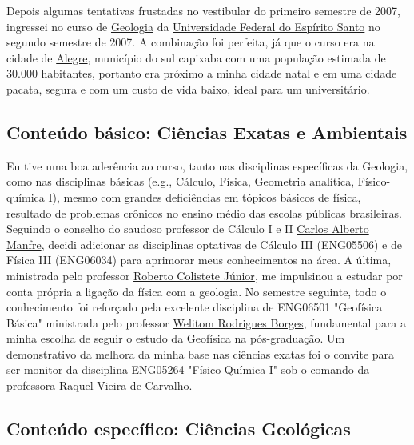 \documentclass[10pt,a4paper,oneside]{book}
\begin{document}
Depois algumas tentativas frustadas no vestibular do primeiro semestre de 2007, ingressei no curso de \href{https://geologia.ufes.br/}{Geologia} da \href{https://www.ufes.br/}{Universidade Federal do Espírito Santo} no segundo semestre de 2007. A combinação foi perfeita, já que o curso era na cidade de \href{https://alegre.es.gov.br/}{Alegre}, município do sul capixaba com uma população estimada de 30.000 habitantes, portanto era próximo a minha cidade natal e em uma cidade pacata, segura e com um custo de vida baixo, ideal para um universitário.

\subsection{Conteúdo básico: Ciências Exatas e Ambientais}
\label{sec_geo_basico}

Eu tive uma boa aderência ao curso, tanto nas disciplinas específicas da Geologia, como nas disciplinas básicas (e.g., Cálculo, Física, Geometria analítica, Físico-química I), mesmo com grandes deficiências em tópicos básicos de física, resultado de problemas crônicos no ensino médio das escolas públicas brasileiras. Seguindo o conselho do saudoso professor de Cálculo I e II \href{http://lattes.cnpq.br/8391815843000996}{Carlos Alberto Manfre}, decidi adicionar as disciplinas optativas de Cálculo III (ENG05506) e de Física III (ENG06034) para aprimorar meus conhecimentos na área. A última, ministrada pelo professor \href{http://lattes.cnpq.br/6503578618806955}{Roberto Colistete Júnior}, me impulsinou a estudar por conta própria a ligação da física com a geologia. No semestre seguinte, todo o conhecimento foi reforçado pela excelente disciplina de ENG06501 "Geofísica Básica" ministrada pelo professor \href{http://lattes.cnpq.br/0799322864183147}{Welitom Rodrigues Borges}, fundamental para a minha escolha de seguir o estudo da Geofísica na pós-graduação. Um demonstrativo da melhora da minha base nas ciências exatas foi o convite para ser monitor da disciplina ENG05264 "Físico-Química I" sob o comando da professora \href{http://lattes.cnpq.br/9146731989810239}{Raquel Vieira de Carvalho}.

\subsection{Conteúdo específico: Ciências Geológicas}
\label{sec_geo_especifico}
\end{document}
